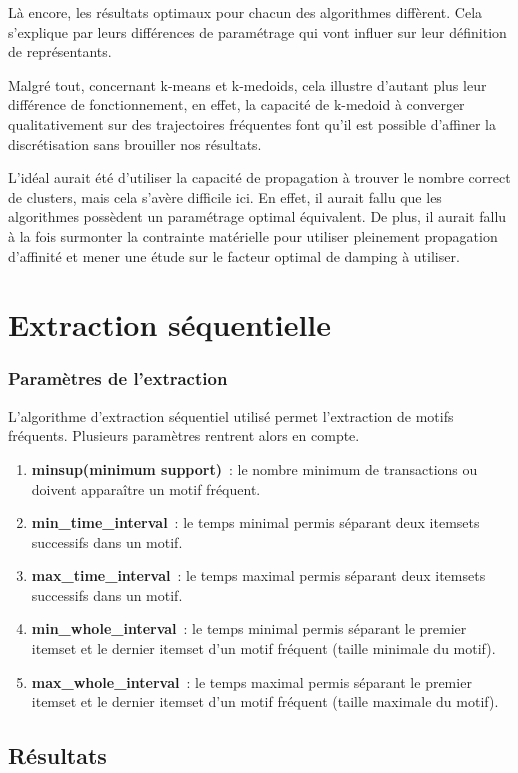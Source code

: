 Là encore, les résultats optimaux pour chacun des algorithmes diffèrent. Cela s'explique par leurs différences de paramétrage qui vont influer sur leur définition de représentants. 

Malgré tout, concernant k-means et k-medoids, cela illustre d'autant plus leur différence de fonctionnement, en effet, la capacité de k-medoid à converger qualitativement sur des trajectoires fréquentes font qu'il est possible d'affiner la discrétisation sans brouiller nos résultats. 

L'idéal aurait été d'utiliser la capacité de propagation à trouver le nombre correct de clusters, mais cela s'avère difficile ici. En effet, il aurait fallu que les algorithmes possèdent un paramétrage optimal équivalent. De plus, il aurait fallu à la fois surmonter la contrainte matérielle pour utiliser pleinement propagation d'affinité et mener une étude sur le facteur optimal de damping à utiliser.

\section{Extraction séquentielle}
\subsubsection{Paramètres de l'extraction}
L'algorithme d'extraction séquentiel utilisé \cite{hirate2006generalized} permet l'extraction de motifs fréquents. Plusieurs paramètres rentrent alors en compte.
\begin{enumerate}
    \item \textbf{minsup(minimum support)}~: le nombre minimum de transactions ou doivent apparaître un motif fréquent.
    \item \textbf{min\_time\_interval}~: le temps minimal permis séparant deux itemsets successifs dans un motif.
    \item \textbf{max\_time\_interval}~: le temps maximal permis séparant deux itemsets successifs dans un motif.
    \item \textbf{min\_whole\_interval}~: le temps minimal permis séparant le premier itemset et le dernier itemset d'un motif fréquent (taille minimale du motif).
    \item \textbf{max\_whole\_interval}~: le temps maximal permis séparant le premier itemset et le dernier itemset d'un motif fréquent (taille maximale du motif).
\end{enumerate}

\subsection{Résultats}

